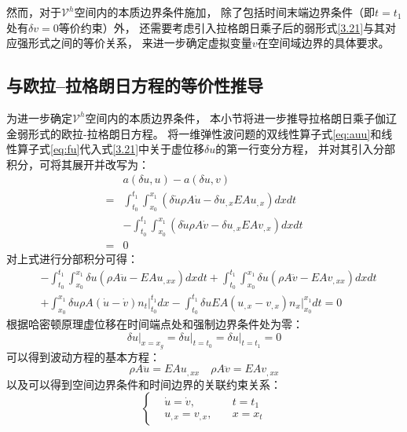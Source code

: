 然而，对于$\mathcal V^h$空间内的本质边界条件施加，
除了包括时间末端边界条件（即$t=t_1$处有$\delta v=0$等价约束）外，
还需要考虑引入拉格朗日乘子后的弱形式\eqref{3.21}与其对应强形式之间的等价关系，
来进一步确定虚拟变量$v$在空间域边界的具体要求。






\subsection{与欧拉--拉格朗日方程的等价性推导}
为进一步确定$\mathcal V^h$空间内的本质边界条件，
本小节将进一步推导拉格朗日乘子伽辽金弱形式的欧拉-拉格朗日方程。
将一维弹性波问题的双线性算子式\eqref{eq:auu}和线性算子式\eqref{eq:fu}代入式\eqref{3.21}中关于虚位移$\delta u$的第一行变分方程，
并对其引入分部积分，可将其展开并改写为：
\begin{equation}
    \begin{aligned}
        &a(\delta u, u) - a(\delta u, v) \\
        =&\int_{t_0}^{t_1}\int_{x_0}^{x_1} (\delta\dot{u}\rho A\dot{u} - \delta u_{,x}EA u_{,x}) dx dt \\
        &- \int_{t_0}^{t_1}\int_{x_0}^{x_1} (\delta\dot{u}\rho A\dot{v} - \delta u_{,x}EA v_{,x}) dx dt \\ 
        =& 0
    \end{aligned}
\end{equation}
对上式进行分部积分可得：
\begin{equation}\label{eq：1fenbujifen}
    \begin{aligned}
        & - \int_{t_0}^{t_1}\int_{x_0}^{x_1} \delta u (\rho A \ddot{u} - EA u_{,xx}) dx dt 
        + \int_{t_0}^{t_1}\int_{x_0}^{x_1} \delta u (\rho A \ddot{v} - EA v_{,xx}) dx dt \\
        & + \int_{x_0}^{x_1} \delta u \rho A (\dot{u} - \dot{v}) n_t \big|_{t_0}^{t_1} dx 
        - \int_{t_0}^{t_1} \delta u EA (u_{,x} - v_{,x}) n_x \big|_{x_0}^{x_1} dt = 0
    \end{aligned}
\end{equation}
根据哈密顿原理虚位移在时间端点处和强制边界条件处为零：
\begin{equation}
    \delta u \vert_{x=x_g} = \delta u\vert_{t=t_0} = \delta u\vert_{t=t_1} = 0
\end{equation}
可以得到波动方程的基本方程：
\begin{equation}
    \rho A \ddot{u} = EA u_{,xx}  \quad \rho A \ddot{v} = EA v_{,xx}
\end{equation}
以及可以得到空间边界条件和时间边界的关联约束关系：
\begin{equation}
    \left \{
        \begin{aligned}
            & \dot u = \dot v,  \quad & t = t_1 \\
            & u_{,x} = v_{,x}, \quad & x = x_t
        \end{aligned}
    \right .
\end{equation}

